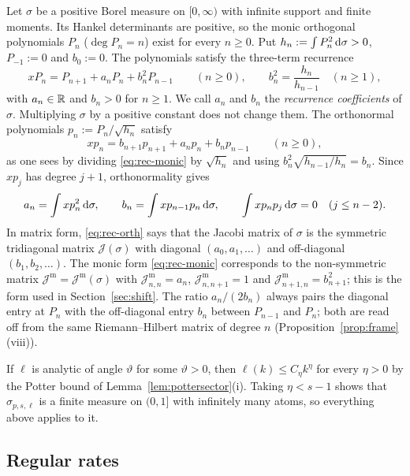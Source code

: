 Let $\sigma$ be a positive Borel measure on $[0,\infty)$ with infinite support and finite moments. Its Hankel
determinants are positive, so the monic orthogonal polynomials $P_n$ ($\deg P_n=n$) exist for every $n\ge0$. Put
$h_n:=\int P_n^2\,\mathrm{d}\sigma>0$, $P_{-1}:=0$ and $b_0:=0$. The polynomials satisfy the three-term recurrence
\begin{equation}\label{eq:rec-monic}
  xP_n=P_{n+1}+a_nP_n+b_n^2P_{n-1}\qquad(n\ge0),\qquad b_n^2=\frac{h_n}{h_{n-1}}\quad(n\ge1),
\end{equation}
with $a_n\in\mathbb{R}$ and $b_n>0$ for $n\ge1$. We call $a_n$ and $b_n$ the \emph{recurrence coefficients} of
$\sigma$. Multiplying $\sigma$ by a positive constant does not change them. The orthonormal polynomials $p_n:=P_n/\sqrt{h_n}$
satisfy
\begin{equation}\label{eq:rec-orth}
  xp_n=b_{n+1}p_{n+1}+a_np_n+b_np_{n-1}\qquad(n\ge0),
\end{equation}
as one sees by dividing \eqref{eq:rec-monic} by $\sqrt{h_n}$ and using $b_n^2\sqrt{h_{n-1}/h_n}=b_n$. Since $xp_j$ has
degree $j+1$, orthonormality gives
\begin{equation}\label{eq:coef-int}
  a_n=\int xp_n^2\,\mathrm{d}\sigma,\qquad b_n=\int xp_{n-1}p_n\,\mathrm{d}\sigma,\qquad \int xp_np_j\,\mathrm{d}\sigma=0\quad(j\le n-2).
\end{equation}
In matrix form, \eqref{eq:rec-orth} says that the Jacobi matrix of $\sigma$ is the symmetric tridiagonal matrix
$\mathcal J(\sigma)$ with diagonal $(a_0,a_1,\dots)$ and off-diagonal $(b_1,b_2,\dots)$. The monic form
\eqref{eq:rec-monic} corresponds to the non-symmetric matrix $\mathcal J^{\mathrm m}=\mathcal J^{\mathrm m}(\sigma)$ with $\mathcal J^{\mathrm m}_{n,n}=a_n$, $\mathcal J^{\mathrm m}_{n,n+1}=1$ and
$\mathcal J^{\mathrm m}_{n+1,n}=b_{n+1}^2$; this is the form used in Section~\ref{sec:shift}. The ratio $a_n/(2b_n)$ always pairs the
diagonal entry at $P_n$ with the off-diagonal entry $b_n$ between $P_{n-1}$ and $P_n$; both are read off from the same
Riemann--Hilbert matrix of degree $n$ (Proposition~\ref{prop:frame}(viii)).

If $\ell$ is analytic of angle $\vartheta$ for some $\vartheta>0$, then $\ell(k)\le C_\eta k^\eta$ for every $\eta>0$
by the Potter bound of Lemma~\ref{lem:pottersector}(i). Taking $\eta<s-1$ shows that $\sigma_{p,s,\ell}$ is a finite
measure on $(0,1]$ with infinitely many atoms, so everything above applies to it.

\subsection{Regular rates}\label{sec:prelim-rates}

